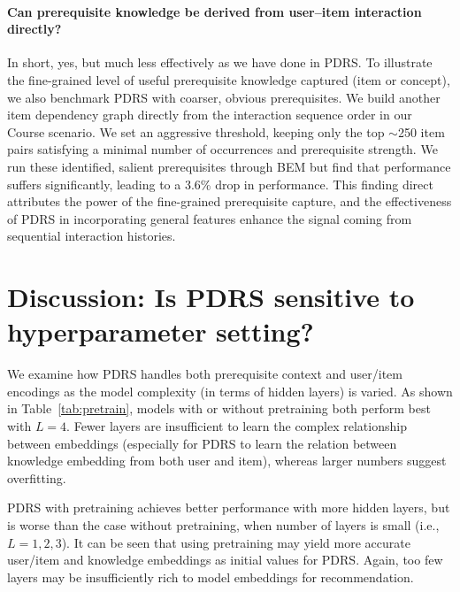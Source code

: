 \paragraph{Can prerequisite knowledge be derived from user--item interaction directly?} In short, yes, but much less effectively as we have done in PDRS.
To illustrate the fine-grained level of useful prerequisite knowledge captured (item or concept), we also benchmark PDRS with coarser, obvious prerequisites.   We build another item dependency graph directly from the interaction sequence order in our Course scenario.
We set an aggressive threshold, keeping only the top $\sim$250 item pairs satisfying a minimal number of occurrences and prerequisite strength.  We run these identified, salient prerequisites through BEM but find that performance suffers significantly, leading to a 3.6\% drop in performance. 
This finding direct attributes the power of the fine-grained prerequisite capture, and the effectiveness of PDRS in incorporating general features enhance the signal coming from sequential interaction histories.  


\section{Discussion: Is PDRS sensitive to hyperparameter setting?}

We examine how PDRS handles both prerequisite context and user/item encodings as the model complexity (in terms of hidden layers) is varied. As shown in Table~\ref{tab:pretrain}, models with or without pretraining both perform best with $L=4$.
Fewer layers are insufficient to learn the complex relationship between embeddings (especially for PDRS to learn the relation between knowledge embedding from both user and item), whereas larger numbers suggest overfitting. 

PDRS with pretraining achieves better performance with more hidden layers, but is worse than the case without pretraining, when number of layers is small (i.e., $L=1,2,3$). It can be seen that using pretraining may yield more accurate user/item and knowledge embeddings as initial values for PDRS. Again, too few layers may be insufficiently rich to model embeddings for recommendation.

